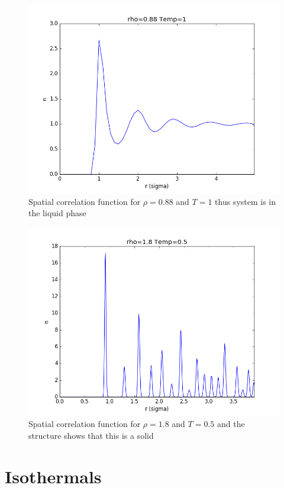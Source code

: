 \documentclass[12pt,a4paper]{report}
\begin{document}
\begin{figure}[H]
\centering
\includegraphics[scale=0.5]{Correlation_rho088_T1_rm35_2.png}
\caption{Spatial correlation function for $\rho=0.88$ and $T=1$ thus system is in the liquid phase}
\label{fig:liq_cor}
\end{figure}

\begin{figure}[H]
\centering
\includegraphics[scale=0.5]{Correlation_rho18_T05_rm35_2.png}
\caption{Spatial correlation function for $\rho=1.8$ and $T=0.5$ and the structure shows that this is a solid}
\label{fig:solid_cor}
\end{figure}

\section{Isothermals}
\end{document}
